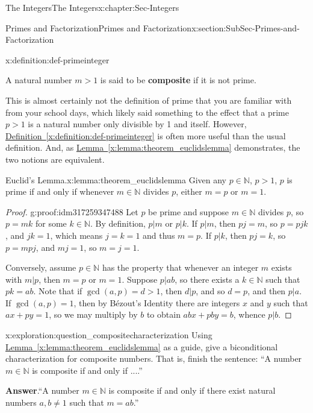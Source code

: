 \documentclass[oneside,10pt,]{book}
\newcommand{\blocktitlefont}{\relax}
\newcommand{\xreffont}{\relax}
\newcommand{\terminology}[1]{\textbf{#1}}
\numberwithin{equation}{section}
\def\N{{\mathbb N}}
\begin{document}
\begin{chapterptx}{The Integers}{}{The Integers}{}{}{x:chapter:Sec-Integers}
\begin{sectionptx}{Primes and Factorization}{}{Primes and Factorization}{}{}{x:section:SubSec-Primes-and-Factorization}
\begin{definition}{}{x:definition:def-primeinteger}
\par
A natural number \(m > 1\) is said to be \terminology{composite} if it is not prime.%
\end{definition}
This is almost certainly not the definition of prime that you are familiar with from your school days, which likely said something to the effect that a prime \(p > 1\) is a natural number only divisible by 1 and itself. However, \hyperref[x:definition:def-primeinteger]{Definition~{\xreffont\ref{x:definition:def-primeinteger}}} is often more useful than the usual definition. And, as \hyperref[x:lemma:theorem_euclidslemma]{Lemma~{\xreffont\ref{x:lemma:theorem_euclidslemma}}} demonstrates, the two notions are equivalent.%
\begin{lemma}{Euclid's Lemma.}{}{x:lemma:theorem_euclidslemma}%
Given any \(p\in \N\), \(p > 1\), \(p\) is prime if and only if whenever \(m\in \N\) divides \(p\), either \(m = p\) or \(m = 1\).%
\end{lemma}
\begin{proof}{}{g:proof:idm317259347488}
Let \(p\) be prime and suppose \(m\in \N\) divides \(p\), so \(p = mk\) for some \(k\in \N\). By definition, \(p|m\) or \(p|k\). If \(p|m\), then \(pj = m\), so \(p = pjk\), and \(jk=1\), which means \(j=k=1\) and thus \(m=p\). If \(p|k\), then \(pj=k\), so \(p = mpj\), and \(mj=1\), so \(m = j = 1\).%
\par
Conversely, assume \(p\in \N\) has the property that whenever an integer \(m\) exists with \(m|p\), then \(m= p\) or \(m =1\). Suppose \(p|ab\), so there exists a \(k\in\N\) such that \(pk = ab\). Note that if \(\gcd(a,p) = d > 1\), then \(d|p\), and so \(d = p\), and then \(p|a\). If \(\gcd(a,p) = 1\), then by Bézout's Identity there are integers \(x\) and \(y\) such that \(ax + py = 1\), so we may multiply by \(b\) to obtain \(abx + pby = b\), whence \(p|b\).%
\end{proof}
\begin{exploration}{}{x:exploration:question_compositecharacterization}%
Using \hyperref[x:lemma:theorem_euclidslemma]{Lemma~{\xreffont\ref{x:lemma:theorem_euclidslemma}}} as a guide, give a biconditional characterization for composite numbers. That is, finish the sentence: ``A number \(m\in\N\) is composite if and only if ....''%
\par\smallskip%
\noindent\textbf{\blocktitlefont Answer}.\hypertarget{g:answer:idm317253078848}{}\quad{}``A number \(m\in\N\) is composite if and only if there exist natural numbers \(a,b\ne 1\) such that \(m = ab\).''%
\end{exploration}

\end{sectionptx}
\end{chapterptx}
\end{document}
